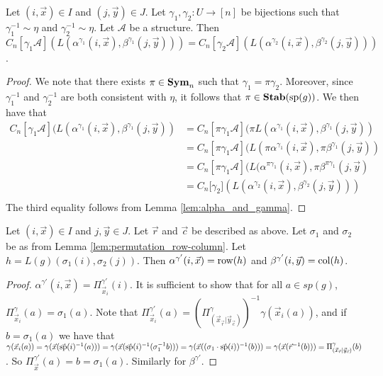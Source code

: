 \documentclass[../paper.tex]{subfiles}
\begin{document}
\begin{lem}
  \label{lem:alpha_ind_gamma}
  Let $(i,\vec{x}) \in I$ and $(j, \vec{y}) \in J$. Let $\gamma_1, \gamma_2: U
  \rightarrow [n]$ be bijections such that $\gamma^{-1}_1 \sim \eta$ and
  $\gamma^{-1}_2 \sim \eta$. Let $\mathcal{A}$ be a structure. Then
  $C_n[\gamma_1 \mathcal{A}] (L(\alpha^{\gamma_1}(i, \vec{x}),
  \beta^{\gamma_1}(j, \vec{y}))) = C_n[\gamma_2 \mathcal{A}]
  (L(\alpha^{\gamma_2}(i, \vec{x}), \beta^{\gamma_2}(j, \vec{y})))$.
\end{lem}
\begin{proof}
  We note that there exists $\pi \in \text{\textbf{Sym}}_n$ such that $\gamma_1 = \pi
  \gamma_2$. Moreover, since $\gamma^{-1}_1$ and $\gamma^{-1}_2$ are both
  consistent with $\eta$, it follows that $\pi \in \text{\textbf{Stab}} (\text{sp} (g))$. We then have
  that
  \begin{align*}
    C_n[\gamma_1 \mathcal{A}](L(\alpha^{\gamma_1}(i, \vec{x}), \beta^{\gamma_1}(j,
    \vec{y})) &= C_n[\pi \gamma_1 \mathcal{A}](\pi L(\alpha^{\gamma_1}(i, \vec{x}),
                \beta^{\gamma_1}(j, \vec{y})) \\
              &= C_n[\pi \gamma_1 \mathcal{A}](L(\pi
                \alpha^{\gamma_1}(i, \vec{x}), \pi \beta^{\gamma_1}(j, \vec{y}))\\
              &= C_n[\pi
                \gamma_1 \mathcal{A}](L(\alpha^{\pi \gamma_1}(i, \vec{x}), \pi \beta^{\pi
                \gamma_1}(j, \vec{y})\\
              &= C_n[\gamma_2 \mathcal] (L(\alpha^{\gamma_2}(i,
                \vec{x}), \beta^{\gamma_2}(j, \vec{y})))\\
  \end{align*}The third equality follows from Lemma \ref{lem:alpha_and_gamma}.
\end{proof}

\begin{lem}
  \label{lem:defining_h_from_IJ}
  Let $(i, \vec{x}) \in I$ and $j, \vec{y} \in J$. Let $\vec{r}$ and $\vec{c}$
  be described as above. Let $\sigma_1$ and $\sigma_2$ be as from Lemma
  \ref{lem:permutation_row-column}. Let $h = L(g) (\sigma_1 (i), \sigma_2 (j))$.
  Then $\alpha^{\gamma'} (i, \vec{x}) = \text{row} (h)$ and $\beta^{\gamma'}
  (i,\vec{y}) = \text{col}(h)$.
\end{lem}
\begin{proof}
  $\alpha^{\gamma'}(i, \vec{x}) = \Pi^{\gamma'}_{\vec{x}_i} (i)$. It is
  sufficient to show that for all $a \in sp(g)$, $\Pi^{\gamma}_{\vec{x}_i} (a) =
  \sigma_1 (a)$. Note that $\Pi^{\gamma'}_{\vec{x}_i} (a) =
  (\Pi^{\gamma}_{(\vec{x}_{\vec{r}} \vert \vec{y}_{\vec{c}})})^{-1} \gamma
  (\vec{x}_i (a))$, and if $b = \sigma_1 (a)$ we have that $\gamma (\vec{x}_i
  (a)) = \gamma (\vec{x} (\vec{\text{sp}}(i)^{-1} (a))) = \gamma (\vec{x}
  (\vec{\text{sp}}(i)^{-1} (\sigma^{-1}_1 b))) = \gamma (\vec{x} ((\sigma_1 \cdot
  \vec{\text{sp}}(i))^{-1} (b))) = \gamma (\vec{x} (\vec{r}^{-1}(b))) =
  \Pi^{\gamma}_{(\vec{x}_{\vec{r}} \vert \vec{y}_{\vec{c}})}(b)$. So
  $\Pi^{\gamma'}_{\vec{x}} (a) = b = \sigma_1 (a)$. Similarly for
  $\beta^{\gamma'}$.
\end{proof}
\end{document}
